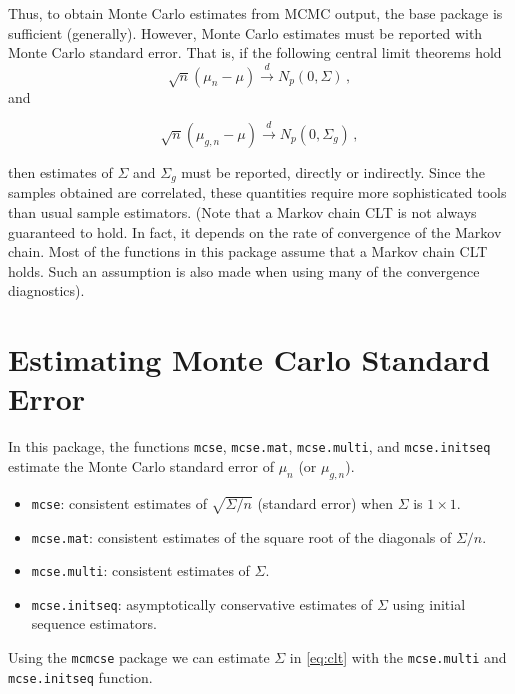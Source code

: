 \documentclass[11pt]{article}\usepackage[]{graphicx}\usepackage[]{color}
\begin{document}
Thus, to obtain Monte Carlo estimates from MCMC output, the base package is sufficient (generally). However, Monte Carlo estimates must be reported with Monte Carlo standard error. That is, if the following central limit theorems hold
\begin{equation}
\label{eq:clt}
\sqrt{n}(\mu_n - \mu) \overset{d}{\to} N_p(0, \Sigma)\,,
\end{equation}
and

\begin{equation}
\label{eq:g_clt}
\sqrt{n}(\mu_{g,n} - \mu) \overset{d}{\to} N_p(0, \Sigma_g)\,,
\end{equation}

then estimates of $\Sigma$ and $\Sigma_g$ must be reported, directly or indirectly. Since the samples obtained are correlated, these quantities require more sophisticated tools than usual sample estimators.
(Note that a Markov chain CLT is not always guaranteed to hold. In fact, it depends on the rate of convergence of the Markov chain. Most of the functions in this package assume that a Markov chain CLT holds. Such an assumption is also made when using many of the convergence diagnostics).

\section{Estimating Monte Carlo Standard Error}
In this package, the functions \texttt{mcse}, \texttt{mcse.mat}, \texttt{mcse.multi}, and \texttt{mcse.initseq} estimate the Monte Carlo standard error of $\mu_n$ (or $\mu_{g,n}$).
\begin{itemize}
\item \texttt{mcse}: consistent estimates of $\sqrt{\Sigma/n}$ (standard error) when $\Sigma$ is $1 \times 1$. 
\item \texttt{mcse.mat}: consistent estimates of the square root of the  diagonals of $\Sigma/n$.
\item \texttt{mcse.multi}: consistent estimates of $\Sigma$.
\item \texttt{mcse.initseq}: asymptotically conservative estimates of $\Sigma$ using initial sequence estimators.
\end{itemize}

Using the \texttt{mcmcse} package we can estimate $\Sigma$ in \eqref{eq:clt} with the \texttt{mcse.multi} and \texttt{mcse.initseq} function.
\end{document}
